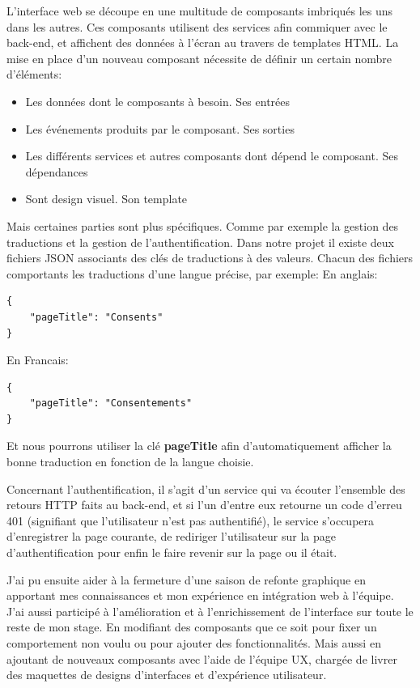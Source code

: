 \documentclass[12pt, a4paper]{report}
\begin{document}
L'interface web se découpe en une multitude de composants imbriqués les uns dans les autres.
Ces composants utilisent des services afin commiquer avec le back-end, et affichent des données à l'écran au travers de templates HTML.
La mise en place d'un nouveau composant nécessite de définir un certain nombre d'éléments:
\begin{itemize}
    \item Les données dont le composants à besoin. Ses entrées
    \item Les événements produits par le composant. Ses sorties
    \item Les différents services et autres composants dont dépend le composant. Ses dépendances
    \item Sont design visuel. Son template\newline
\end{itemize}
Mais certaines parties sont plus spécifiques. Comme par exemple la gestion des traductions et la gestion de l'authentification.
Dans notre projet il existe deux fichiers JSON associants des clés de traductions à des valeurs. Chacun des fichiers comportants les traductions d'une langue précise, par exemple:\newline
En anglais:
\begin{lstlisting}
{
    "pageTitle": "Consents"
}
\end{lstlisting}
En Francais:
\begin{lstlisting}
{
    "pageTitle": "Consentements"
}
\end{lstlisting}
Et nous pourrons utiliser la clé \textbf{pageTitle} afin d'automatiquement afficher la bonne traduction en fonction de la langue choisie.\newline

Concernant l'authentification, il s'agit d'un service qui va écouter l'ensemble des retours HTTP faits au back-end, et si l'un d'entre eux retourne un code d'erreu 401 (signifiant que l'utilisateur n'est pas authentifié), le service s'occupera d'enregistrer la page courante, de rediriger l'utilisateur sur la page d'authentification pour enfin le faire revenir sur la page ou il était.\newline

J'ai pu ensuite aider à la fermeture d'une saison de refonte graphique en apportant mes connaissances et mon expérience en intégration web à l'équipe.\newline
J'ai aussi participé à l'amélioration et à l'enrichissement de l'interface sur toute le reste de mon stage. En modifiant des composants que ce soit pour fixer un comportement non voulu ou pour ajouter des fonctionnalités. Mais aussi en ajoutant de nouveaux composants avec l'aide de l'équipe UX, chargée de livrer des maquettes de designs d'interfaces et d'expérience utilisateur.\newline
\end{document}
